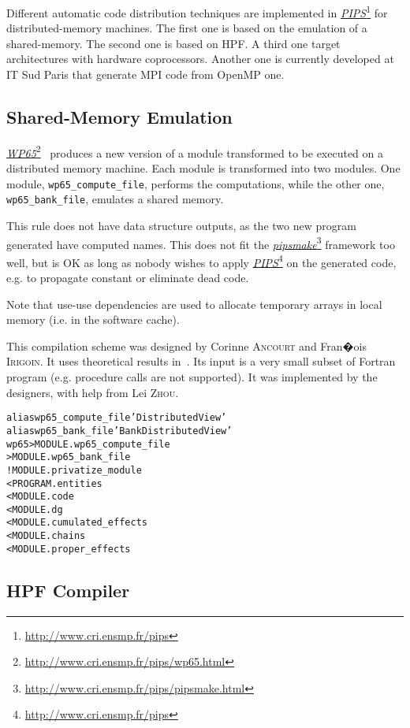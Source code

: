 \documentclass[a4paper]{report}
\newenvironment{PipsMake}{\begin{alltt}}{\end{alltt}}
\newcommand{\LINK}[2]{\href{#2}{#1}\footnote{\url{#2}}\xspace}
\newcommand{\PIPS}{\LINK{\emph{PIPS}}{http://www.cri.ensmp.fr/pips}}
\newcommand{\PIPSMAKE}{\LINK{\emph{pipsmake}}{http://www.cri.ensmp.fr/pips/pipsmake.html}\xspace}
\newcommand{\WPsc}{\LINK{\emph{WP65}}{http://www.cri.ensmp.fr/pips/wp65.html}}
\begin{document}
Different automatic code distribution techniques are implemented in \PIPS{} for
distributed-memory machines. The first one is based on the emulation of
a shared-memory. The second one is based on HPF. A third one target
architectures with hardware coprocessors. Another one is currently
developed at IT Sud Paris that generate MPI code from OpenMP one.

\subsection{Shared-Memory Emulation}
\label{subsubsection-shared-memory-emulation}

\WPsc{}~\cite{IA91,IA92a,IA92b} produces a new version of a module
transformed to be executed on a distributed memory machine. Each module
is transformed into two modules. One module, \verb+wp65_compute_file+,
performs the computations, while the other one, \verb+wp65_bank_file+,
emulates a shared memory.

This rule does not have data structure outputs, as the two new program
generated have computed names. This does not fit the \PIPSMAKE{} framework
too well, but is OK as long as nobody wishes to apply \PIPS{} on the
generated code, e.g. to propagate constant or eliminate dead code.

Note that use-use dependencies are used to allocate temporary arrays in
local memory (i.e. in the software cache).

This compilation scheme was designed by Corinne \textsc{Ancourt} and Fran�ois
\textsc{Irigoin}. It uses theoretical results in~\cite{AI91}. Its input is a very
small subset of Fortran program (e.g. procedure calls are not supported).
It was implemented by the designers, with help from Lei \textsc{Zhou}.

\begin{PipsMake}
alias wp65_compute_file 'Distributed View'
alias wp65_bank_file 'Bank Distributed View'
wp65                            > MODULE.wp65_compute_file
                                > MODULE.wp65_bank_file
        ! MODULE.privatize_module
        < PROGRAM.entities
        < MODULE.code
        < MODULE.dg
        < MODULE.cumulated_effects
        < MODULE.chains
        < MODULE.proper_effects

\end{PipsMake}



\subsection{HPF Compiler}
\label{subsubsection-hpf-compiler}
\end{document}
